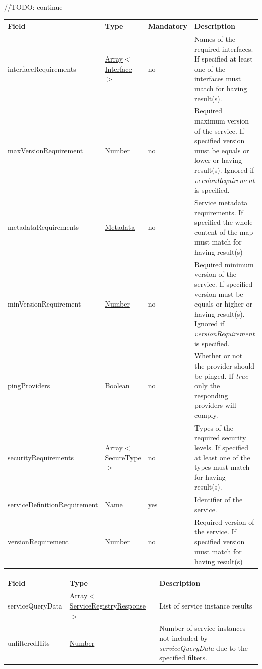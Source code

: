 \documentclass[a4paper]{arrowhead}
\newcommand{\pref}[1]{{\textcolor{ArrowheadGrey}{\hyperref[sec:model:primitives:#1]{#1}}}}
\begin{document}
//TODO: continue


\label{sec:model:SQF}

\begin{table}[ht!]
\begin{tabularx}{\textwidth}{| p{5cm} | p{3cm} | p{2cm} | X |} \hline
\rowcolor{gray!33} Field & Type & Mandatory & Description \\ \hline
interfaceRequirements &\pref{Array}$<$\pref{Interface}$>$ & no & Names of the required interfaces. If specified at least one of the interfaces must match for having result(s). \\ \hline
maxVersionRequirement &\pref{Number} & no & Required maximum version of the service. If specified version must be equals or lower or having result(s). Ignored if \textit{versionRequirement} is specified. \\ \hline
metadataRequirements &\pref{Metadata} & no & Service metadata requirements. If specified the whole content of
the map must match for having result(s) \\ \hline
minVersionRequirement &\pref{Number} & no & Required minimum version of the service. If specified version must be equals or higher or having result(s). Ignored if \textit{versionRequirement} is specified. \\ \hline
pingProviders &\pref{Boolean} & no & Whether or not the provider should be pinged. If \textit{true} only the responding providers will comply. \\ \hline
securityRequirements &\pref{Array}$<$\pref{SecureType}$>$ & no & Types of the required security levels. If specified at least one of the types must match for having result(s). \\ \hline
serviceDefinitionRequirement &\pref{Name} & yes & Identifier of the service. \\ \hline
versionRequirement &\pref{Number} & no & Required version of the service. If specified version must match for having result(s) \\ \hline
\end{tabularx}
\end{table}

\clearpage


\begin{table}[ht!]
\begin{tabularx}{\textwidth}{| p{3cm} | p{6cm} | X |} \hline
\rowcolor{gray!33} Field & Type      & Description \\ \hline
serviceQueryData & \pref{Array}$<$\pref{ServiceRegistryResponse}$>$     & List of service instance results \\ \hline
unfilteredHits & \pref{Number} & Number of service instances not included by \textit{serviceQueryData} due to the specified filters. \\ \hline
\end{tabularx}
\end{table}
\end{document}

